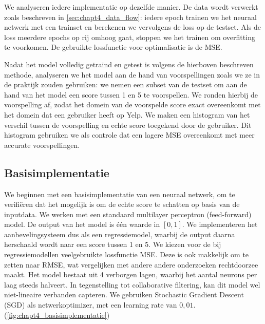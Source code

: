 We analyseren iedere implementatie op dezelfde manier. De data wordt verwerkt zoals beschreven in \autoref{sec:chapt4_data_flow}: iedere epoch trainen we het neuraal netwerk met een trainset en berekenen we vervolgens de loss op de testset. Als de loss meerdere epochs op rij omhoog gaat, stoppen we het trainen om overfitting te voorkomen. De gebruikte lossfunctie voor optimalisatie is de MSE.

Nadat het model volledig getraind en getest is volgens de hierboven beschreven methode, analyseren we het model aan de hand van voorspellingen zoals we ze in de praktijk zouden gebruiken: we nemen een subset van de testset om aan de hand van het model een score tussen 1 en 5 te voorspellen. We ronden hierbij de voorspelling af, zodat het domein van de voorspelde score exact overeenkomt met het domein dat een gebruiker heeft op Yelp. We maken een histogram van het verschil tussen de voorspelling en echte score toegekend door de gebruiker. Dit histogram gebruiken we als controle dat een lagere MSE overeenkomt met meer accurate voorspellingen.

\subsection{Basisimplementatie}
\label{sec:chapt4_basisimplementatie}
We beginnen met een basisimplementatie van een neuraal netwerk, om te verifiëren dat het mogelijk is om de echte score te schatten op basis van de inputdata. We werken met een standaard multilayer perceptron (feed-forward) model. De output van het model is één waarde in $[0, 1]$. We implementeren het aanbevelingsysteem dus als een regressiemodel, waarbij de output daarna herschaald wordt naar een score tussen 1 en 5. We kiezen voor de bij regressiemodellen veelgebruikte lossfunctie MSE. Deze is ook makkelijk om te zetten naar RMSE, wat vergelijken met andere andere onderzoeken rechtdoorzee maakt. \cite{narre, deepconn, wide_deep_learning_paper}
Het model bestaat uit 4 verborgen lagen, waarbij het aantal neurons per laag steeds halveert. In tegenstelling tot collaborative filtering, kan dit model wel niet-lineaire verbanden capteren. We gebruiken Stochastic Gradient Descent (SGD) als netwerkoptimizer, met een learning rate van $0,01$.(\autoref{fig:chapt4_basisimplementatie})




